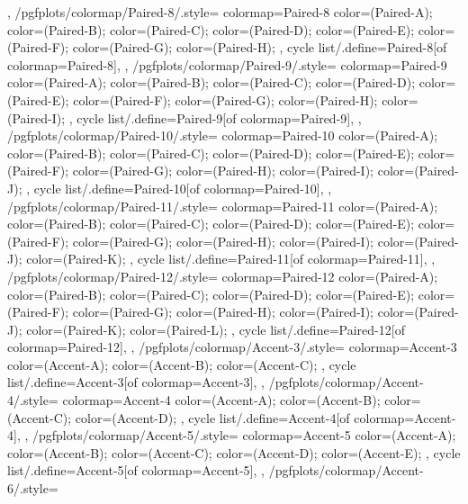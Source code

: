 {{  },
  /pgfplots/colormap/Paired-8/.style={
    colormap={Paired-8}{
      color=(Paired-A);
      color=(Paired-B);
      color=(Paired-C);
      color=(Paired-D);
      color=(Paired-E);
      color=(Paired-F);
      color=(Paired-G);
      color=(Paired-H);
    },
    cycle list/.define={Paired-8}{[of colormap=Paired-8]},
  },
  /pgfplots/colormap/Paired-9/.style={
    colormap={Paired-9}{
      color=(Paired-A);
      color=(Paired-B);
      color=(Paired-C);
      color=(Paired-D);
      color=(Paired-E);
      color=(Paired-F);
      color=(Paired-G);
      color=(Paired-H);
      color=(Paired-I);
    },
    cycle list/.define={Paired-9}{[of colormap=Paired-9]},
  },
  /pgfplots/colormap/Paired-10/.style={
    colormap={Paired-10}{
      color=(Paired-A);
      color=(Paired-B);
      color=(Paired-C);
      color=(Paired-D);
      color=(Paired-E);
      color=(Paired-F);
      color=(Paired-G);
      color=(Paired-H);
      color=(Paired-I);
      color=(Paired-J);
    },
    cycle list/.define={Paired-10}{[of colormap=Paired-10]},
  },
  /pgfplots/colormap/Paired-11/.style={
    colormap={Paired-11}{
      color=(Paired-A);
      color=(Paired-B);
      color=(Paired-C);
      color=(Paired-D);
      color=(Paired-E);
      color=(Paired-F);
      color=(Paired-G);
      color=(Paired-H);
      color=(Paired-I);
      color=(Paired-J);
      color=(Paired-K);
    },
    cycle list/.define={Paired-11}{[of colormap=Paired-11]},
  },
  /pgfplots/colormap/Paired-12/.style={
    colormap={Paired-12}{
      color=(Paired-A);
      color=(Paired-B);
      color=(Paired-C);
      color=(Paired-D);
      color=(Paired-E);
      color=(Paired-F);
      color=(Paired-G);
      color=(Paired-H);
      color=(Paired-I);
      color=(Paired-J);
      color=(Paired-K);
      color=(Paired-L);
    },
    cycle list/.define={Paired-12}{[of colormap=Paired-12]},
  },
  /pgfplots/colormap/Accent-3/.style={
    colormap={Accent-3}{
      color=(Accent-A);
      color=(Accent-B);
      color=(Accent-C);
    },
    cycle list/.define={Accent-3}{[of colormap=Accent-3]},
  },
  /pgfplots/colormap/Accent-4/.style={
    colormap={Accent-4}{
      color=(Accent-A);
      color=(Accent-B);
      color=(Accent-C);
      color=(Accent-D);
    },
    cycle list/.define={Accent-4}{[of colormap=Accent-4]},
  },
  /pgfplots/colormap/Accent-5/.style={
    colormap={Accent-5}{
      color=(Accent-A);
      color=(Accent-B);
      color=(Accent-C);
      color=(Accent-D);
      color=(Accent-E);
    },
    cycle list/.define={Accent-5}{[of colormap=Accent-5]},
  },
  /pgfplots/colormap/Accent-6/.style={
}}
